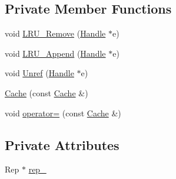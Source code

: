 \subsection*{Private Member Functions}
\begin{DoxyCompactItemize}
\item 
void \hyperlink{classleveldb_1_1_cache_ae92ff3b0f33bd9bf346928069974950a}{L\-R\-U\-\_\-\-Remove} (\hyperlink{structleveldb_1_1_cache_1_1_handle}{Handle} $\ast$e)
\item 
void \hyperlink{classleveldb_1_1_cache_acc07bab282052c2eb1310d098cd4f99e}{L\-R\-U\-\_\-\-Append} (\hyperlink{structleveldb_1_1_cache_1_1_handle}{Handle} $\ast$e)
\item 
void \hyperlink{classleveldb_1_1_cache_a1b1489f524cd29e05ae3f679a2552b98}{Unref} (\hyperlink{structleveldb_1_1_cache_1_1_handle}{Handle} $\ast$e)
\item 
\hyperlink{classleveldb_1_1_cache_aacc66de3a00854fa38fc53625aecc569}{Cache} (const \hyperlink{classleveldb_1_1_cache}{Cache} \&)
\item 
void \hyperlink{classleveldb_1_1_cache_a62c682ea6c99e53156229053b3fccb5f}{operator=} (const \hyperlink{classleveldb_1_1_cache}{Cache} \&)
\end{DoxyCompactItemize}
\subsection*{Private Attributes}
\begin{DoxyCompactItemize}
\item 
Rep $\ast$ \hyperlink{classleveldb_1_1_cache_aceb7389e9fbb571dcab109d4824e9960}{rep\-\_\-}
\end{DoxyCompactItemize}



